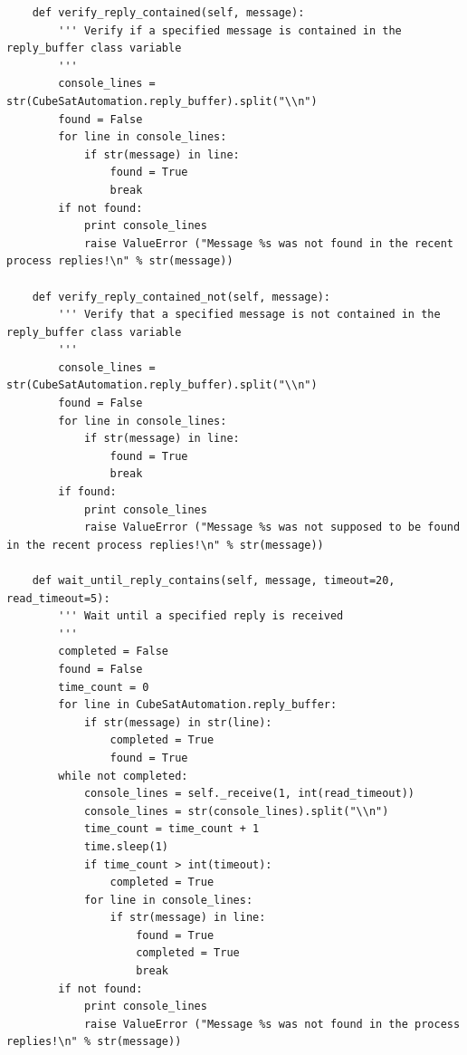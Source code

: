 \documentclass[english,12pt,a4paper,pdftex,elec,utf8]{aaltothesis}
\begin{document}
\begin{verbatim}
	def verify_reply_contained(self, message):
		'''	Verify if a specified message is contained in the reply_buffer class variable
		'''
		console_lines = str(CubeSatAutomation.reply_buffer).split("\\n")
		found = False
		for line in console_lines:
			if str(message) in line:
				found = True
				break
		if not found:
			print console_lines				
			raise ValueError ("Message %s was not found in the recent process replies!\n" % str(message))

	def verify_reply_contained_not(self, message):
		'''	Verify that a specified message is not contained in the reply_buffer class variable
		'''
		console_lines = str(CubeSatAutomation.reply_buffer).split("\\n")
		found = False
		for line in console_lines:
			if str(message) in line:
				found = True
				break
		if found:
			print console_lines				
			raise ValueError ("Message %s was not supposed to be found in the recent process replies!\n" % str(message))

	def wait_until_reply_contains(self, message, timeout=20, read_timeout=5):
		'''	Wait until a specified reply is received
		'''
		completed = False
		found = False
		time_count = 0
		for line in CubeSatAutomation.reply_buffer:
			if str(message) in str(line):
				completed = True
				found = True
		while not completed:
			console_lines = self._receive(1, int(read_timeout))
			console_lines = str(console_lines).split("\\n")
			time_count = time_count + 1
			time.sleep(1)
			if time_count > int(timeout):
				completed = True
			for line in console_lines:
				if str(message) in line:
					found = True
					completed = True
					break
		if not found:
			print console_lines				
			raise ValueError ("Message %s was not found in the process replies!\n" % str(message))
            

\end{verbatim}
\end{document}
